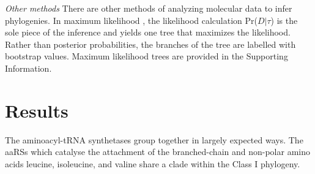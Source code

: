 \documentclass[10pt,letterpaper]{article}
\begin{document}
\textit{Other methods}  There are other methods of analyzing molecular data to infer phylogenies.  In maximum likelihood \cite{Guindon}, the likelihood calculation Pr($D|\tau$) is the sole piece of the inference and yields one tree that maximizes the likelihood.  Rather than posterior probabilities, the branches of the tree are labelled with bootstrap values. \cite{HolderLewis}
Maximum likelihood trees are provided in the Supporting Information.



\section*{Results}

The aminoacyl-tRNA synthetases group together in largely expected ways.  The aaRSs which catalyse the attachment of the branched-chain and non-polar amino acids leucine, isoleucine, and valine share a clade within the Class I phylogeny.
\end{document}
